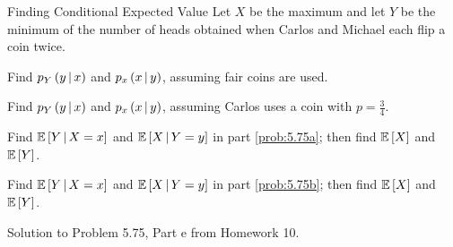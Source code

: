 		\begin{example}[Problem 5.75]{Finding Conditional Expected Value}
                  Let $X$ be the maximum and let $Y$ be the minimum of the number of heads obtained when Carlos and Michael each flip a coin twice.
                  \begin{boldalphlist}
                  \item Find $p_{Y} \left( y \operatorname{\vert} x \right)$ and $p_{x} \left( x \operatorname{\vert} y \right)$, assuming fair coins are used. \label{prob:5.75a}
                  \item Find $p_{Y} \left( y \operatorname{\vert} x \right)$ and $p_{x} \left( x \operatorname{\vert} y \right)$, assuming Carlos uses a coin with $p = \frac{3}{4}$. \label{prob:5.75b}
                  \item Find $\operatorname{\operatorname{\mathbb{E}}} \left[ Y \operatorname{\vert} X=x \right]$ and $\operatorname{\operatorname{\mathbb{E}}} \left[ X \operatorname{\vert} Y=y \right]$ in part \ref{prob:5.75a}; then find $\operatorname{\operatorname{\mathbb{E}}} \left[ X \right]$ and $\operatorname{\operatorname{\mathbb{E}}} \left[ Y \right]$.
                  \item Find $\operatorname{\operatorname{\mathbb{E}}} \left[ Y \operatorname{\vert} X=x \right]$ and $\operatorname{\operatorname{\mathbb{E}}} \left[ X \operatorname{\vert} Y=y \right]$ in part \ref{prob:5.75b}; then find $\operatorname{\operatorname{\mathbb{E}}} \left[ X \right]$ and $\operatorname{\operatorname{\mathbb{E}}} \left[ Y \right]$.
                  \end{boldalphlist}

                  \tcblower

                  Solution to Problem 5.75, Part e from Homework 10.
		\end{example}
